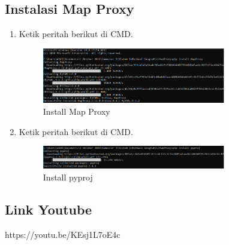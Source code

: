 \subsection{Instalasi Map Proxy}
\begin{enumerate}
	\item  Ketik peritah berikut di CMD.
	\hfill\break
	\begin{figure}[H]
		\includegraphics[width=8cm]{figures/Tugas4/1174077/9.png}
		\centering
		\caption{Install Map Proxy}
	\end{figure}
	\item  Ketik peritah berikut di CMD.
	\hfill\break
	\begin{figure}[H]
		\includegraphics[width=8cm]{figures/Tugas4/1174077/10.png}
		\centering
		\caption{Install pyproj}
	\end{figure}
\end{enumerate}
\subsection{Link Youtube}
https://youtu.be/KEsj1L7oE4c
